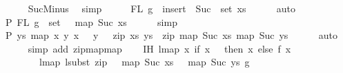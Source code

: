 \begin{isabellebody}
\ \ \ \ \isamarkupfalse%
\ SucMinus\ \isamarkupfalse%
\ simp\isanewline
\ \ \isamarkupfalse%
\ \isamarkupfalse%
\ {\isachardoublequoteopen}FL\ g\ {\isasymsubseteq}\ insert\ {}\ {\isacharparenleft}{\kern0pt}Suc\ {\isacharbackquote}{\kern0pt}\ set\ xs{\isacharparenright}{\kern0pt}{\isachardoublequoteclose}\isanewline
\ \ \ \ \isamarkupfalse%
\ auto\isanewline
\ \ \isamarkupfalse%
\ \isamarkupfalse%
\ P{}{\isacharcolon}{\kern0pt}\ {\isachardoublequoteopen}FL\ g\ {\isasymsubseteq}\ set\ {\isacharparenleft}{\kern0pt}{}\ {\isacharhash}{\kern0pt}\ map\ Suc\ xs{\isacharparenright}{\kern0pt}{\isachardoublequoteclose}\isanewline
\ \ \ \ \isamarkupfalse%
\ simp\isanewline
\isanewline
\ \ \isamarkupfalse%
\ P{}{\isacharcolon}{\kern0pt}\ {\isachardoublequoteopen}{\isasymforall}ys{\isachardot}{\kern0pt}\ map\ {\isacharparenleft}{\kern0pt}{\isasymlambda}{\isacharparenleft}{\kern0pt}x{\isacharcomma}{\kern0pt}\ y{\isacharparenright}{\kern0pt}{\isachardot}{\kern0pt}\ {\isacharparenleft}{\kern0pt}x\ {\isacharplus}{\kern0pt}\ {}{\isacharcomma}{\kern0pt}\ y\ {\isacharplus}{\kern0pt}\ {}{\isacharparenright}{\kern0pt}{\isacharparenright}{\kern0pt}\ {\isacharparenleft}{\kern0pt}zip\ xs\ ys{\isacharparenright}{\kern0pt}\ {\isacharequal}{\kern0pt}\ zip\ {\isacharparenleft}{\kern0pt}map\ Suc\ xs{\isacharparenright}{\kern0pt}\ {\isacharparenleft}{\kern0pt}map\ Suc\ ys{\isacharparenright}{\kern0pt}{\isachardoublequoteclose}\isanewline
\ \ \ \ \isamarkupfalse%
\ auto\isanewline
\ \ \ \ \isamarkupfalse%
\ {\isacharparenleft}{\kern0pt}simp\ add{\isacharcolon}{\kern0pt}\ zip{\isacharunderscore}{\kern0pt}map{\isacharunderscore}{\kern0pt}map{\isacharparenright}{\kern0pt}\isanewline
\isanewline
\ \ \isamarkupfalse%
\ IH{\isacharcolon}{\kern0pt}\ {\isachardoublequoteopen}lmap\ {\isacharparenleft}{\kern0pt}{\isasymlambda}x{\isachardot}{\kern0pt}\ if\ x\ {\isacharequal}{\kern0pt}\ {}\ then\ x\ else\ {\isacharparenleft}{\kern0pt}f\ {\isacharparenleft}{\kern0pt}x\ {\isacharminus}{\kern0pt}\ {}{\isacharparenright}{\kern0pt}\ {\isacharplus}{\kern0pt}\ {}{\isacharparenright}{\kern0pt}{\isacharparenright}{\kern0pt}\isanewline
\ \ \ \ \ \ \ \ {\isacharparenleft}{\kern0pt}lmap\ {\isacharparenleft}{\kern0pt}lsubst\ {\isacharparenleft}{\kern0pt}zip\ {\isacharparenleft}{\kern0pt}{}\ {\isacharhash}{\kern0pt}\ map\ Suc\ xs{\isacharparenright}{\kern0pt}\ {\isacharparenleft}{\kern0pt}{}\ {\isacharhash}{\kern0pt}\ map\ Suc\ ys{\isacharparenright}{\kern0pt}{\isacharparenright}{\kern0pt}{\isacharparenright}{\kern0pt}\ g{\isacharparenright}{\kern0pt}\ {\isacharequal}{\kern0pt}\isanewline

\end{isabellebody}

